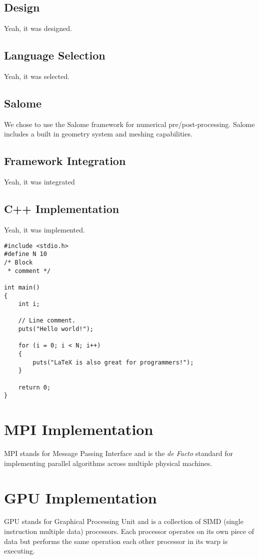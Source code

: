 \documentclass{article}
\numberwithin{equation}{subsection}
\begin{document}
\subsection{Design}
Yeah, it was designed.

\subsection{Language Selection}
Yeah, it was selected.

\subsection{Salome}
We chose to use the Salome framework for numerical pre/post-processing. Salome includes a built in geometry system and meshing capabilities.

\subsection{Framework Integration}
Yeah, it was integrated

\subsection{C++ Implementation}
Yeah, it was implemented.

\begin{lstlisting}
#include <stdio.h>
#define N 10
/* Block
 * comment */

int main()
{
    int i;

    // Line comment.
    puts("Hello world!");
    
    for (i = 0; i < N; i++)
    {
        puts("LaTeX is also great for programmers!");
    }

    return 0;
}
\end{lstlisting}

\section{MPI Implementation}
MPI stands for Message Passing Interface and is the \textit{de Facto} standard for implementing parallel algorithms across multiple physical machines.

\section{GPU Implementation}
GPU stands for Graphical Processing Unit and is a collection of SIMD (single instruction multiple data) processors. Each processor operates on its own piece of data but performs the same operation each other processor in its warp is executing.
\end{document}
